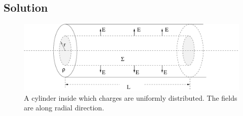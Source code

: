 \documentclass[solutions]{esg8022pset}
\begin{document}
\subsection{Solution}
  \begin{figure}[ht]
    \begin{center}
      \includegraphics[width=12cm]{ps02_sol_05}
      \caption{A cylinder inside which charges are uniformly
      distributed. The fields are along radial direction.}
      \label{fig:cylinder3}
    \end{center}
  \end{figure}
\end{document}
